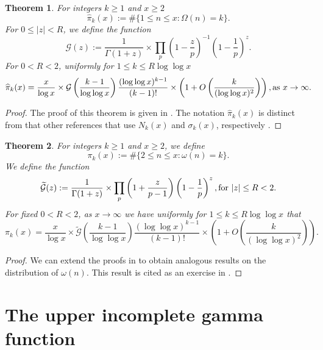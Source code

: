 \documentclass[11pt,reqno,a4letter]{article}
\numberwithin{equation}{section}
\numberwithin{figure}{section}
\numberwithin{table}{section}
\let\citep\cite
\newcommand{\cf}{cf.~}
\theoremstyle{plain}
\newtheorem{theorem}{Theorem}
\numberwithin{theorem}{section}
\theoremstyle{definition}
\theoremstyle{remark}
\newcommand{\mathtext}[1]{\text{\rm #1}}
\begin{document}
\begin{theorem}
\label{theorem_HatPi_ExtInTermsOfGz} 
For integers $k \geq 1$ and $x \geq 2$ 
$$\widehat{\pi}_k(x) := \#\{1 \leq n \leq x: \Omega(n)=k\}.$$ 
For $0 \leq |z| < R$, we define the function 
\[
\mathcal{G}(z) := \frac{1}{\Gamma(1+z)} \times 
	\prod_p \left(1-\frac{z}{p}\right)^{-1} \left(1-\frac{1}{p}\right)^z. 
\]
For $0 < R < 2$, uniformly for $1 \leq k \leq R \log\log x$ 
\begin{equation}
\label{eqn_PiHatkx_UniformAsymptoticsStmt_from_MV_v1}
\widehat{\pi}_k(x) = \frac{x}{\log x} \times \mathcal{G}\left(\frac{k-1}{\log\log x}\right) 
     \frac{(\log\log x)^{k-1}}{(k-1)!} \times \left(1 + O\left(\frac{k}{(\log\log x)^2}\right)\right), 
     \mathtext{ as } x \rightarrow \infty. 
\end{equation}
\end{theorem}
\begin{proof}
The proof of this theorem is given in \cite[Thm.~7.19; \S 7.4]{MV}. 
The notation $\widehat{\pi}_k(x)$ is distinct from that 
other references that use $N_k(x)$ and $\sigma_k(x)$, 
respectively \citep[Eqn.~(7.61)]{MV} \citep[\cf \S II.6]{TENENBAUM-PROBNUMT-METHODS}. 
\end{proof}

\begin{theorem} 
\label{remark_MV_Pikx_FuncResultsAnnotated_v1} 
For integers $k  \geq 1$ and $x \geq 2$, we define 
\[
\pi_k(x) := \#\{2 \leq n \leq x: \omega(n)=k\}.
\]
We define the function 
\[
\widetilde{\mathcal{G}}(z) := \frac{1}{\Gamma(1+z)} \times 
	\prod_p \left(1 + \frac{z}{p-1}\right) \left(1 - \frac{1}{p}\right)^{z}, 
	\mathtext{ for } |z| \leq R < 2. 
\]
For fixed $0 < R < 2$, as $x \rightarrow \infty$ we have 
uniformly for $1 \leq k \leq R\log\log x$ that 
\begin{equation}
\label{eqn_Pikx_UniformAsymptoticsStmt_from_MV_v2} 
\pi_k(x) = \frac{x}{\log x} \times 
     \widetilde{\mathcal{G}}\left(\frac{k-1}{\log\log x}\right) 
     \frac{(\log\log x)^{k-1}}{(k-1)!} \times \left( 
     1 + O\left(\frac{k}{(\log\log x)^2}\right) 
     \right). 
\end{equation}
\end{theorem}
\begin{proof}
We can extend the proofs in \cite[\S 7]{MV} to obtain 
analogous results on the distribution of $\omega(n)$. 
This result is cited as an exercise in \cite{MV}. 
\end{proof}

\section{The upper incomplete gamma function} 
\label{subSection_OtherFactsAndResults} 
\end{document}
